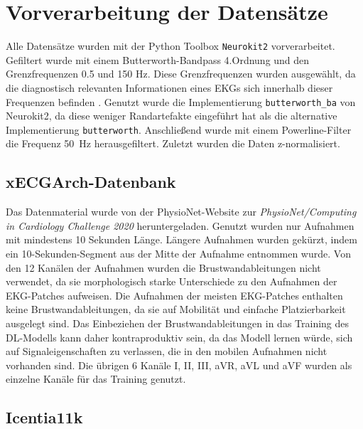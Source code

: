 \section{Vorverarbeitung der Datensätze}\label{sec:vorverarbeitung}

Alle Datensätze wurden mit der Python Toolbox \texttt{Neurokit2} \cite{makowski_neurokit2_2021} vorverarbeitet. Gefiltert wurde mit einem Butterworth-Bandpass 4.Ordnung und den Grenzfrequenzen 0.5 und 150 Hz. Diese Grenzfrequenzen wurden ausgewählt, da die diagnostisch relevanten Informationen eines \gls{EKG}s sich innerhalb dieser Frequenzen befinden \cite{kligfield_recommendations_2007}. Genutzt wurde die Implementierung \texttt{butterworth\_ba} von Neurokit2, da diese weniger Randartefakte eingeführt hat als die alternative Implementierung \texttt{butterworth}. Anschließend wurde mit einem Powerline-Filter die Frequenz 50~Hz herausgefiltert. Zuletzt wurden die Daten z-normalisiert.
 
\subsection*{xECGArch-Datenbank}

Das Datenmaterial wurde von der PhysioNet-Website \cite{goldberger_physiobank_2000} zur \textit{PhysioNet/Computing in Cardiology Challenge 2020} \cite{perez_alday_classification_2020} \cite{perez_alday_classification_nodate} heruntergeladen. Genutzt wurden nur Aufnahmen mit mindestens 10 Sekunden Länge. Längere Aufnahmen wurden gekürzt, indem ein 10-Sekunden-Segment aus der Mitte der Aufnahme entnommen wurde. Von den 12 Kanälen der Aufnahmen wurden die Brustwandableitungen nicht verwendet, da sie morphologisch starke Unterschiede zu den Aufnahmen der \gls{EKG}-Patches aufweisen. Die Aufnahmen der meisten \gls{EKG}-Patches enthalten keine Brustwandableitungen, da sie auf Mobilität und einfache Platzierbarkeit ausgelegt sind. Das Einbeziehen der Brustwandableitungen in das Training des \gls{DL}-Modells kann daher kontraproduktiv sein, da das Modell lernen würde, sich auf Signaleigenschaften zu verlassen, die in den mobilen Aufnahmen nicht vorhanden sind. Die übrigen 6 Kanäle I, II, III, aVR, aVL und aVF wurden als einzelne Kanäle für das  Training genutzt.


\subsection*{Icentia11k}

